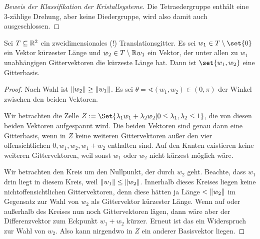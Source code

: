 \begin{proof}[Beweis der Klassifikation der Kristallsysteme]
Die Tetraedergruppe enthält eine 3-zählige Drehung, aber keine Diedergruppe, wird also damit auch ausgeschlossen.
\end{proof}

\begin{lemma}\label{kristalle:gitterbasen_2D_kuerzeste_vektoren}
Sei $T\subseteq\mathbb{R}^2$ ein zweidimensionales (!) Translationsgitter. Es sei $w_1\in T\setminus\set{0}$ ein Vektor kürzester Länge und $w_2\in T \setminus \mathbb{R} w_1$ ein Vektor, der unter allen zu $w_1$ unabhängigen Gittervektoren die kürzeste Länge hat. Dann ist $\set{w_1,w_2}$ eine Gitterbasis.
\end{lemma}
\begin{proof}
Nach Wahl ist $\lVert w_2\rVert\geq\lVert w_1\rVert$. Es sei $\theta=\sphericalangle(w_1,w_2) \in (0,\pi)$ der Winkel zwischen den beiden Vektoren.

Wir betrachten die Zelle $Z:=\Set{\lambda_1 w_1+ \lambda_2 w_2 | 0\leq \lambda_1,\lambda_2\leq 1}$, die von diesen beiden Vektoren aufgespannt wird. Die beiden Vektoren sind genau dann eine Gitterbasis, wenn in $Z$ keine weiteren Gittervektoren außer den vier offensichtlichen $0,w_1,w_2,w_1+w_2$ enthalten sind. Auf den Kanten existieren keine weiteren Gittervektoren, weil sonst $w_1$ oder $w_2$ nicht kürzest möglich wäre.

Wir betrachten den Kreis um den Nullpunkt, der durch $w_2$ geht. Beachte, dass $w_1$ drin liegt in diesem Kreis, weil $\lVert w_1\rVert\leq \lVert w_2\rVert$. Innerhalb dieses Kreises liegen keine nichtoffensichtlichen Gittervektoren, denn diese hätten ja Länge $<\lVert w_2\rVert$ im Gegensatz zur Wahl von $w_2$ als Gittervektor kürzester Länge. Wenn auf oder außerhalb des Kreises nun noch Gittervektoren lägen, dann wäre aber der Differenzvektor zum Eckpunkt  $w_1+w_2$ kürzer. Erneut ist das ein Widerspruch zur Wahl von $w_2$. Also kann nirgendwo in $Z$ ein anderer Basisvektor liegen.
\end{proof}